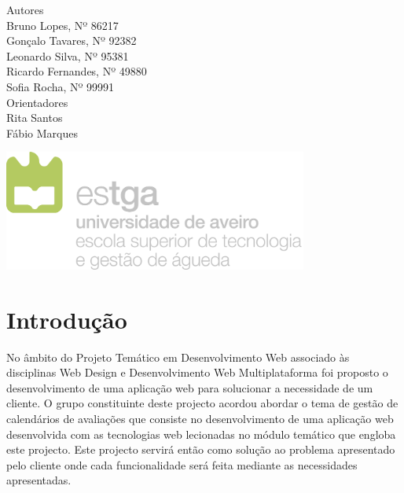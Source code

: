 \documentclass[11pt, twoside]{report}
\begin{document}
\begin{titlepage}
		
		
		\large
		Autores\\
		Bruno Lopes, Nº 86217 \\
		Gonçalo Tavares, Nº 92382  \\
		Leonardo Silva, Nº 95381 \\
		Ricardo Fernandes, Nº 49880  \\
		Sofia Rocha, Nº 99991 \\
		
		\vspace{1cm}
		Orientadores\\
		Rita Santos \\
		Fábio Marques\\
		\vspace{4cm}
		
		\centering
		\includegraphics[width=10cm]{image/AssB_vertical_cor}
		
	\end{titlepage}

	\newpage
	\setcounter{page}{1} %
	\tableofcontents %
	\thispagestyle{plain} %
	\thispagestyle{empty} %
	\newpage
	\listoftables %
	\newpage
	\listoffigures %
	
	\newpage
	
	
	\chapter{Introdução}
	
	No âmbito do Projeto Temático em Desenvolvimento Web associado às disciplinas Web Design e Desenvolvimento Web Multiplataforma foi proposto o desenvolvimento de uma aplicação web para solucionar a necessidade de um cliente. 
	O grupo constituinte deste projecto acordou abordar o tema de gestão de calendários de avaliações que consiste no desenvolvimento de uma aplicação web desenvolvida com as tecnologias web lecionadas no módulo temático que engloba este projecto.
	Este projecto servirá então como solução ao problema apresentado pelo cliente onde cada funcionalidade será feita mediante as necessidades apresentadas.
	
\end{document}

